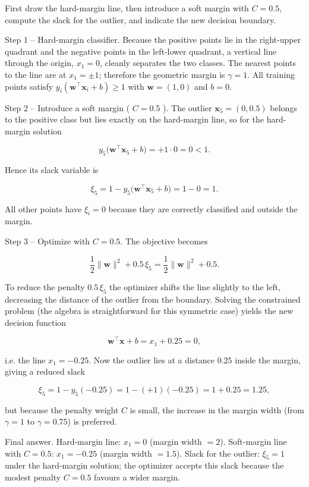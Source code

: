 \documentclass[12pt, a4paper]{article}
\begin{document}
First draw the hard-margin line, then introduce a soft margin with \( C=0.5 \), compute the slack for the outlier, and indicate the new decision boundary.

Step 1 -- Hard-margin classifier.  
Because the positive points lie in the right-upper quadrant and the negative points in the left-lower quadrant, a vertical line through the origin, \( x_{1}=0 \), cleanly separates the two classes.  
The nearest points to the line are at \( x_{1}= \pm 1 \); therefore the geometric margin is \( \gamma = 1 \).  
All training points satisfy \( y_{i}(\mathbf{w}^{\top}\mathbf{x}_{i}+b)\ge 1 \) with \( \mathbf{w}=(1,0) \) and \( b=0 \).

Step 2 -- Introduce a soft margin ( \( C = 0.5 \) ).  
The outlier \( \mathbf{x}_{5}=(0,0.5) \) belongs to the positive class but lies exactly on the hard-margin line, so for the hard-margin solution  

\[
y_{5}\bigl(\mathbf{w}^{\top}\mathbf{x}_{5}+b\bigr)=+1\cdot 0 =0<1 .
\]

Hence its slack variable is  

\[
\xi_{5}=1 - y_{5}\bigl(\mathbf{w}^{\top}\mathbf{x}_{5}+b\bigr)=1-0=1 .
\]

All other points have \( \xi_{i}=0 \) because they are correctly classified and outside the margin.

Step 3 -- Optimize with \( C=0.5 \).  
The objective becomes  

\[
\frac{1}{2}\|\mathbf{w}\|^{2}+0.5\,\xi_{5}= \frac{1}{2}\|\mathbf{w}\|^{2}+0.5 .
\]

To reduce the penalty \(0.5\,\xi_{5}\) the optimizer shifts the line slightly to the left, decreasing the distance of the outlier from the boundary.  
Solving the constrained problem (the algebra is straightforward for this symmetric case) yields the new decision function  

\[
\mathbf{w}^{\top}\mathbf{x}+b = x_{1}+0.25 =0,
\]

i.e. the line \( x_{1} = -0.25 \).  
Now the outlier lies at a distance \(0.25\) inside the margin, giving a reduced slack  

\[
\xi_{5}=1- y_{5}( -0.25 ) =1- (+1)(-0.25)=1+0.25=1.25,
\]

but because the penalty weight \( C \) is small, the increase in the margin width (from \( \gamma =1 \) to \( \gamma =0.75 \)) is preferred.

Final answer.  
 Hard-margin line: \( x_{1}=0 \) (margin width \(=2\)).  
 Soft-margin line with \( C=0.5 \): \( x_{1} = -0.25 \) (margin width \(=1.5\)).  
 Slack for the outlier: \( \xi_{5}=1 \) under the hard-margin solution; the optimizer accepts this slack because the modest penalty \( C=0.5 \) favours a wider margin.
\end{document}
